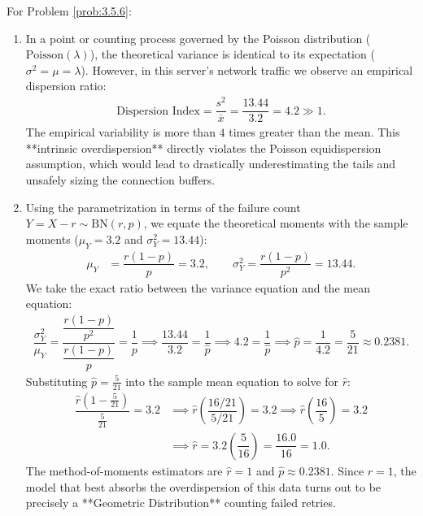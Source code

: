 \begin{solucion}
	\label{sol:3.5.6}
	For Problem \ref{prob:3.5.6}:
	\begin{enumerate}
		\item In a point or counting process governed by the Poisson distribution ($\text{Poisson}(\lambda)$), the theoretical variance is identical to its expectation ($\sigma^2 = \mu = \lambda$). However, in this server's network traffic we observe an empirical dispersion ratio:
		\begin{align*}
			\text{Dispersion Index} = \dfrac{s^2}{\bar{x}} = \dfrac{13.44}{3.2} = 4.2 \gg 1.
		\end{align*}
		The empirical variability is more than $4$ times greater than the mean. This **intrinsic overdispersion** directly violates the Poisson equidispersion assumption, which would lead to drastically underestimating the tails and unsafely sizing the connection buffers.
		\item Using the parametrization in terms of the failure count $Y = X - r \sim \text{BN}(r, p)$, we equate the theoretical moments with the sample moments ($\mu_Y = 3.2$ and $\sigma_Y^2 = 13.44$):
		\begin{align*}
			\mu_Y &= \dfrac{r(1-p)}{p} = 3.2, \qquad \sigma_Y^2 = \dfrac{r(1-p)}{p^2} = 13.44.
		\end{align*}
		We take the exact ratio between the variance equation and the mean equation:
		\begin{align*}
			\dfrac{\sigma_Y^2}{\mu_Y} = \dfrac{\dfrac{r(1-p)}{p^2}}{\dfrac{r(1-p)}{p}} = \dfrac{1}{p} \implies \dfrac{13.44}{3.2} = \dfrac{1}{\hat{p}} \implies 4.2 = \dfrac{1}{\hat{p}} \implies \hat{p} = \dfrac{1}{4.2} = \dfrac{5}{21} \approx 0.2381.
		\end{align*}
		Substituting $\hat{p} = \frac{5}{21}$ into the sample mean equation to solve for $\hat{r}$:
		\begin{align*}
			\dfrac{\hat{r}\left(1 - \frac{5}{21}\right)}{\frac{5}{21}} = 3.2 &\implies \hat{r}\left(\dfrac{16/21}{5/21}\right) = 3.2 \implies \hat{r}\left(\dfrac{16}{5}\right) = 3.2 \\
			&\implies \hat{r} = 3.2 \left(\dfrac{5}{16}\right) = \dfrac{16.0}{16} = 1.0.
		\end{align*}
		The method-of-moments estimators are $\hat{r} = 1$ and $\hat{p} \approx 0.2381$. Since $r=1$, the model that best absorbs the overdispersion of this data turns out to be precisely a **Geometric Distribution** counting failed retries.
	\end{enumerate}
\end{solucion}

